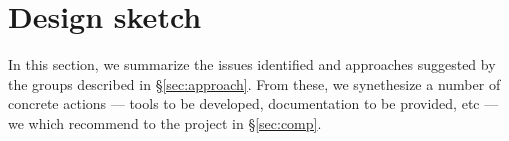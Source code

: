 \section{Design sketch}
\label{sec:design}

In this section, we summarize the issues identified and approaches suggested
by the groups described in \S\ref{sec:approach}. From these, we synethesize a
number of concrete actions --- tools to be developed, documentation to be
provided, etc --- we which recommend to the project in \S\ref{sec:comp}.




